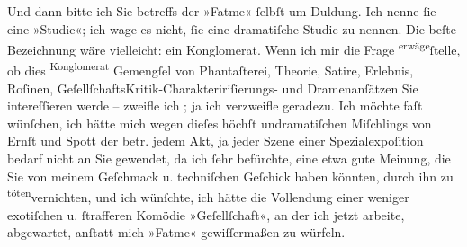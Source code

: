 \pstart
           Und dann bitte ich Sie \introOben{}betreffs\introOben{} der »Fatme« ſelbſt  um Duldung.
               Ich nenne ſie eine »Studie«; ich wage es nicht, ſie eine dramatiſche Studie zu
               nennen. Die beſte Bezeichnung wäre vielleicht: ein Konglomerat. Wenn ich \introOben{}mir\introOben{} die Frage \substVorne{}\textsuperscript{erwäge}\substDazwischen{}ſtelle\substHinten{}, ob dies \substVorne{}\textsuperscript{Konglomerat}\substDazwischen{} Gemengſel\substHinten{} von  Phantaſterei, \introOben{}Theorie, \introOben{}{ }Satire, \introOben{}Erlebnis\introOben{}, Roſinen,
                  \introOben{}Geſellſchafts\introOben{}Kritik-\introOben{}Charakteririſierungs-\introOben{} und Dramenanſätzen Sie intereſſieren werde –  zweifle ich ; ja ich verzweifle geradezu. Ich möchte
               faſt wünſchen, ich hätte mich \introOben{}wegen\introOben{} dieſes \introOben{}höchſt undramatiſchen\introOben{} Miſchlings von Ernſt und Spott \introOben{}der betr.  jedem Akt, ja jeder Szene  einer
                  Spezialexpoſition  bedarf\introOben{}{ } nicht an Sie gewendet, da ich ſehr befürchte,
               eine etwa gute Meinung, die Sie von meinem Geſchmack \introOben{}u.
                  techniſchen Geſchick\introOben{} haben könnten, durch
                  \introOben{}ihn\introOben{} zu \substVorne{}\textsuperscript{töten}\substDazwischen{}vernichten\substHinten{}, und ich wünſchte, ich hätte die Vollendung einer \introOben{}weniger
                  exotiſchen u. ſtrafferen\introOben{} Komödie »Geſellſchaft«, an der ich jetzt arbeite, abgewartet, anſtatt mich »Fatme« \introOben{}gewiſſermaßen\introOben{} zu
               würfeln.\pend
           
